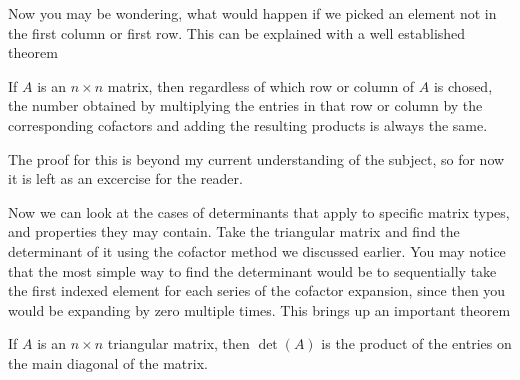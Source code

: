 Now you may be wondering, what would happen if we picked an element not in the
first column or first row. This can be explained with a well established theorem
\begin{theorem}
    If $A$ is an $n\times n$ matrix, then regardless of which row or column of
    $A$ is chosed, the number obtained by multiplying the entries in that row or
    column by the corresponding cofactors and adding the resulting products is
    always the same.
\end{theorem}
The proof for this is beyond my current understanding of the subject, so for now
it is left as an excercise for the reader.

Now we can look at the cases of determinants that apply to specific matrix
types, and properties they may contain. Take the triangular matrix and find the
determinant of it using the cofactor method we discussed earlier. You may notice
that the most simple way to find the determinant would be to sequentially take
the first indexed element for each series of the cofactor expansion, since then
you would be expanding by zero multiple times. This brings up an important
theorem
\begin{theorem}
    If $A$ is  an $n\times n$ triangular matrix, then $\det{(A)}$ is the product
    of the entries on the main diagonal of the matrix.
\end{theorem}
